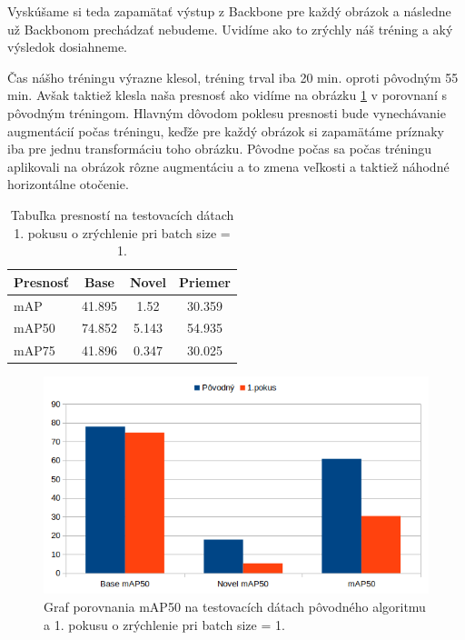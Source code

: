 Vyskúšame si teda zapamätať výstup z Backbone pre každý obrázok a následne už Backbonom prechádzať nebudeme. Uvidíme ako to zrýchly náš tréning a aký výsledok dosiahneme. 

Čas nášho tréningu výrazne klesol, tréning trval iba 20 min. oproti pôvodným 55 min. Avšak taktiež klesla naša presnosť ako vidíme na obrázku \ref{fig:image11} v porovnaní s pôvodným tréningom. Hlavným dôvodom poklesu presnosti bude vynechávanie augmentácií počas tréningu, keďže pre každý obrázok si zapamätáme príznaky iba pre jednu transformáciu toho obrázku. Pôvodne počas sa počas tréningu aplikovali na obrázok rôzne augmentáciu a to zmena veľkosti a taktiež náhodné horizontálne otočenie. 

\begin{table}[H]
\begin{tabular}{|l|c|c|c|}
\hline
\textbf{Presnosť} & \textbf{Base} & \textbf{Novel} & \textbf{Priemer} \\
\hline
mAP & 41.895 & 1.52 & 30.359 \\
mAP50 & 74.852 & 5.143 & 54.935 \\
mAP75 & 41.896 & 0.347 & 30.025 \\
\hline
\end{tabular}
\centering
\caption{Tabuľka presností na testovacích dátach 1. pokusu o zrýchlenie pri batch size = 1.}
\label{tab:table53}
\end{table}

\begin{figure}[H]
\centering
\includegraphics[width=\textwidth]{images/faster_1attempt_chart.png}
\caption{Graf porovnania mAP50 na testovacích dátach pôvodného algoritmu a 1. pokusu o zrýchlenie pri batch size = 1.}
\label{fig:image11}
\end{figure}

